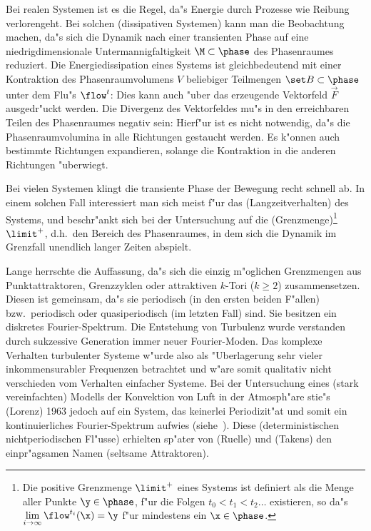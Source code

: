 Bei realen Systemen ist es die Regel, da"s Energie durch Prozesse wie Reibung
verlorengeht. Bei solchen \begriff(dissipativen Systemen) kann man die Beobachtung
machen, da"s sich die Dynamik nach einer transienten Phase auf eine 
niedrigdimensionale Untermannigfaltigkeit $\M\subset\phase$ des Phasenraumes
reduziert. Die Energiedissipation eines Systems ist gleichbedeutend mit einer Kontraktion
des Phasenraumvolumens $V$ beliebiger Teilmengen $\set B\subset\phase$ unter dem Flu"s $\flow^t$:
Dies kann auch "uber das erzeugende Vektorfeld $\vec F$ ausgedr"uckt werden. Die Divergenz
des Vektorfeldes mu"s in den erreichbaren Teilen des Phasenraumes negativ sein:
Hierf"ur ist es nicht notwendig, da"s die Phasenraumvolumina in alle Richtungen gestaucht
werden. Es k"onnen auch bestimmte Richtungen expandieren, solange die Kontraktion in
die anderen Richtungen "uberwiegt.

Bei vielen Systemen klingt die transiente Phase der Bewegung recht schnell ab. In einem solchen
Fall interessiert man sich meist f"ur das \begriff(Langzeitverhalten) des Systems, und
beschr"ankt sich bei der Untersuchung auf die \begriff(Grenzmenge)\footnote{Die positive
  Grenzmenge $\limit^+$ eines Systems ist definiert als die Menge aller Punkte $\y\in\phase$, f"ur
  die Folgen $t_0\lt t_1\lt t_2\dots$ existieren, so da"s
  $\lim\limits_{i\to\infty}\flow^{t_i}(\x)=\y$ f"ur mindestens ein $\x\in\phase$.}
$\limit^+$, d.h.\ den Bereich des Phasenraumes, in dem sich die Dynamik im Grenzfall
unendlich langer Zeiten abspielt.

Lange herrschte die Auffassung, da"s sich die einzig m"oglichen Grenzmengen aus
Punkt\-attraktoren, Grenzzyklen oder attraktiven $k$-Tori ($k\geq2$) zusammensetzen.
Diesen ist gemeinsam, da"s sie periodisch (in den ersten beiden F"allen) bzw.\ periodisch
oder quasiperiodisch (im letzten Fall) sind. Sie besitzen ein diskretes
Fourier-Spektrum.  Die Entstehung von Turbulenz wurde verstanden durch
sukzessive Generation immer neuer Fourier-Moden.  Das komplexe Verhalten turbulenter
Systeme w"urde also als "Uberlagerung sehr vieler inkommensurabler Frequenzen betrachtet
und w"are somit qualitativ nicht verschieden vom Verhalten einfacher Systeme. Bei der
Untersuchung eines (stark vereinfachten) Modells der Konvektion von Luft in der
Atmosph"are stie"s \autor(Lorenz) 1963 \cite{Lorenz63} jedoch auf ein System, das
keinerlei Periodizit"at und somit ein kontinuierliches Fourier-Spektrum aufwies
(siehe~). Diese \begriff(deterministischen nichtperiodischen Fl"usse)
erhielten sp"ater von \autor(Ruelle) und \autor(Takens) \cite{Ruelle71a} den
einpr"agsamen Namen \begriff(seltsame Attraktoren).


